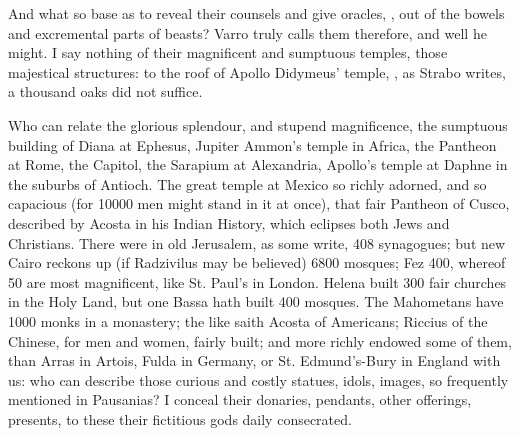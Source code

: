 {And what so base as to reveal their counsels and give oracles, , out of the bowels and excremental parts of
beasts?  Varro truly calls them therefore, and well he
might. I say nothing of their magnificent and sumptuous temples, those
majestical structures: to the roof of Apollo Didymeus' temple, , as Strabo writes, a thousand oaks did not suffice.

Who can relate the glorious splendour, and stupend magnificence, the
sumptuous building of Diana at Ephesus, Jupiter Ammon's temple in
Africa, the Pantheon at Rome, the Capitol, the Sarapium at Alexandria,
Apollo's temple at Daphne in the suburbs of Antioch. The great temple
at Mexico so richly adorned, and so capacious (for 10\thinspace{}000 men might
stand in it at once), that fair Pantheon of Cusco, described by Acosta
in his Indian History, which eclipses both Jews and Christians. There
were in old Jerusalem, as some write, 408 synagogues; but new Cairo
reckons up (if Radzivilus may be believed) 6800 mosques; Fez 400,
whereof 50 are most magnificent, like St. Paul's in London. Helena
built 300 fair churches in the Holy Land, but one Bassa hath built 400
mosques. The Mahometans have 1000 monks in a monastery; the like saith
Acosta of Americans; Riccius of the Chinese, for men and women, fairly
built; and more richly endowed some of them, than Arras in Artois,
Fulda in Germany, or St. Edmund's-Bury in England with us: who can
describe those curious and costly statues, idols, images, so frequently
mentioned in Pausanias? I conceal their donaries, pendants, other
offerings, presents, to these their fictitious gods daily consecrated.

}
